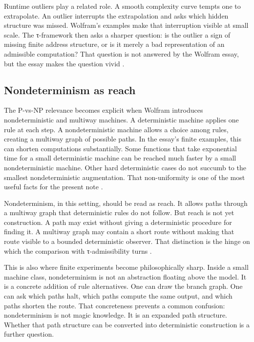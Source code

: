 \documentclass{pantarhei-researchnote}
\begin{document}
Runtime outliers play a related role. A smooth complexity curve tempts
one to extrapolate. An outlier interrupts the extrapolation and asks
which hidden structure was missed. Wolfram's examples make that
interruption visible at small scale. The τ-framework then asks a sharper
question: is the outlier a sign of missing finite address structure, or
is it merely a bad representation of an admissible computation? That
question is not answered by the Wolfram essay, but the essay makes the
question vivid \cite{Wolfram2026RuliologicalPNP}.

\subsection{Nondeterminism as reach}

The P-vs-NP relevance becomes explicit when Wolfram introduces
nondeterministic and multiway machines. A deterministic machine applies one
rule at each step. A nondeterministic machine allows a choice among rules,
creating a multiway graph of possible paths. In the essay's finite
examples, this can shorten computations substantially. Some functions that
take exponential time for a small deterministic machine can be reached much
faster by a small nondeterministic machine. Other hard deterministic cases
do not succumb to the smallest nondeterministic augmentation. That
non-uniformity is one of the most useful facts for the present note
\cite{Wolfram2026RuliologicalPNP}.

Nondeterminism, in this setting, should be read as reach. It allows paths
through a multiway graph that deterministic rules do not follow. But reach
is not yet construction. A path may exist without giving a deterministic
procedure for finding it. A multiway graph may contain a short route
without making that route visible to a bounded deterministic observer. That
distinction is the hinge on which the comparison with τ-admissibility
turns \cite{Wolfram2026RuliologicalPNP}.

This is also where finite experiments become philosophically sharp.
Inside a small machine class, nondeterminism is not an abstraction
floating above the model. It is a concrete addition of rule alternatives.
One can draw the branch graph. One can ask which paths halt, which paths
compute the same output, and which paths shorten the route. That
concreteness prevents a common confusion: nondeterminism is not magic
knowledge. It is an expanded path structure. Whether that path structure
can be converted into deterministic construction is a further question.
\end{document}
